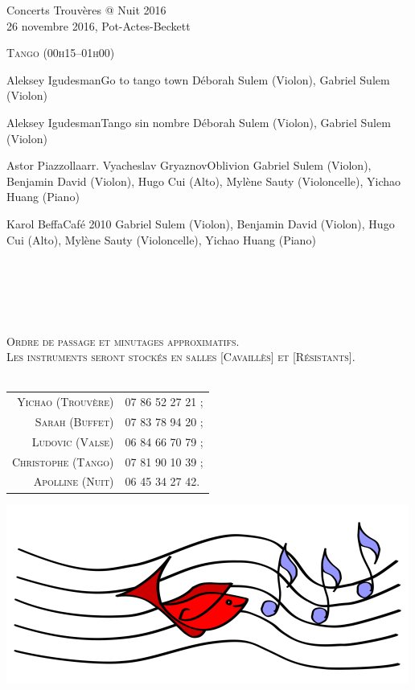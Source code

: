 \documentclass[a4paper,11pt,poets,durations]{ConcProg}
\begin{document}
{\begin{programme}{
    Concerts Trouvères @ Nuit 2016
\\  {\normalsize 26 novembre 2016, Pot-Actes-Beckett}
}
\begin{part}[]
\begin{center}
\textsc{Tango (00h15--01h00)}
\end{center}
    \begin{composition}{Aleksey Igudesman}{}{Go to tango town}{}
      {\small Déborah Sulem (Violon), Gabriel Sulem (Violon)}
    \end{composition}
    \begin{composition}{Aleksey Igudesman}{}{Tango sin nombre}{}
      {\small Déborah Sulem (Violon), Gabriel Sulem (Violon)}
    \end{composition}
    \begin{composition}{Astor Piazzolla}{arr. Vyacheslav Gryaznov}{Oblivion}{}
      {\small Gabriel Sulem (Violon), Benjamin David (Violon), Hugo Cui (Alto), Mylène Sauty (Violoncelle), Yichao Huang (Piano)}
    \end{composition}
    \begin{composition}{Karol Beffa}{}{Café 2010}{}
      {\small Gabriel Sulem (Violon), Benjamin David (Violon), Hugo Cui (Alto), Mylène Sauty (Violoncelle), Yichao Huang (Piano)}
    \end{composition}\\
~\\
~\\
~\\
\begin{center}
\textsc{Ordre de passage et minutages approximatifs.\\Les instruments seront stockés en salles [Cavaillès] et [Résistants].}\\
~\\
\begin{tabular}{rl}
\textsc{Yichao (Trouvère)} & \textsc{07 86 52 27 21 ;}\\
\textsc{Sarah (Buffet)} & \textsc{07 83 78 94 20 ;}\\
\textsc{Ludovic (Valse)} & \textsc{06 84 66 70 79 ;}\\
\textsc{Christophe (Tango)} & \textsc{07 81 90 10 39 ;}\\
\textsc{Apolline (Nuit)} & \textsc{06 45 34 27 42.}
\end{tabular}
\end{center}
  \end{part}
\end{programme}
}
\begin{center}
\includegraphics[scale=2]{logo.png}
\end{center}
\end{document}
